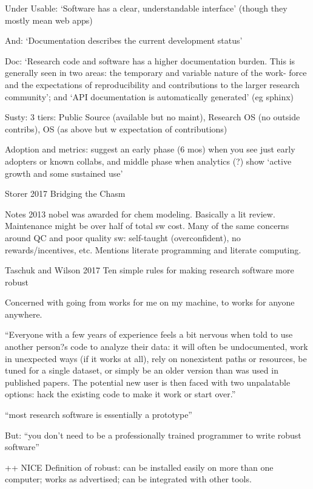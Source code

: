 \documentclass[12pt]{amsart}
\begin{document}
Under Usable: `Software has a clear, understandable interface' (though they mostly mean web apps)

And: `Documentation describes the current development status'

Doc: `Research code and software has a higher documentation burden. This is generally seen in two areas: the temporary and variable nature of the work- force and the expectations of reproducibility and contributions to the larger research community'; and `API documentation is automatically generated' (eg sphinx)

Susty: 3 tiers: Public Source (available but no maint), Research OS (no outside contribs), OS (as above but w expectation of contributions)

Adoption and metrics: suggest an early phase (6 mos) when you see just early adopters or known collabs, and middle phase when analytics (?) show `active growth and some sustained use'



Storer 2017 Bridging the Chasm

Notes 2013 nobel was awarded for chem modeling. Basically a lit review. Maintenance might be over half of total sw cost. Many of the same concerns around QC and poor quality sw: self-taught (overconfident), no rewards/incentives, etc. Mentions literate programming and literate computing.



Taschuk and Wilson 2017 Ten simple rules for making research software more robust

Concerned with going from works for me on my machine, to works for anyone anywhere. 

``Everyone with a few years of experience feels a bit nervous when told to use another person?s code to analyze their data: it will often be undocumented, work in unexpected ways (if it works at all), rely on nonexistent paths or resources, be tuned for a single dataset, or simply be an older version than was used in published papers. The potential new user is then faced with two unpalatable options: hack the existing code to make it work or start over.''

``most research software is essentially a prototype''

But: ``you don't need to be a professionally trained programmer to write robust software''

++ NICE Definition of robust: can be installed easily on more than one computer; works as advertised; can be integrated with other tools.
\end{document}
